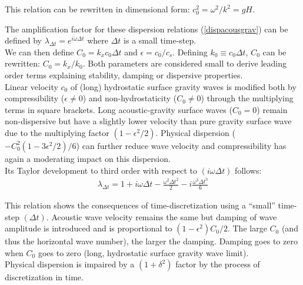 \documentclass[a4paper,11pt]{article}
\begin{document}
  This relation can be rewritten in dimensional form: $c_0^2 = {\omega^2}/{k^2}= gH$.
  
  The amplification factor for these dispersion relations (\ref{dispacousgrav}) can be defined by $\lambda_{\Delta t}=e^{i\omega\Delta t}$ where $\Delta t$ is a small time-step.\\

  We can then define $C_0=k_x c_0\Delta t$ and $\epsilon={c_0}/{c_s}$. Defining $ k_0\equiv c_0 \Delta t$, $C_0$ can be rewritten: $C_0=k_x/k_0$.
  Both parameters are considered small to derive leading order terms explaining stability, damping or dispersive properties.\\
    
    
  Linear velocity $c_0$ of (long) hydrostatic surface gravity waves is modified both by compressibility ($\epsilon\ne0$) and non-hydrostaticity ($C_0\ne0$) through the multiplying terms in square brackets. Long acoustic-gravity surface waves ($C_0=0$) remain non-dispersive but have a slightly lower velocity than pure gravity surface wave due to the multiplying factor $(1-\epsilon^2/2)$. Physical dispersion ($-C_0^2(1-3\epsilon^2/2)/6$) can further reduce wave velocity and compressibility has again a moderating impact on this dispersion.\\

  Its Taylor development to third order with respect to $(i\omega\Delta t)$ follows:
  \begin{equation}
   \label{lambdadt}
    \begin{split}
      \displaystyle
      \lambda_{\Delta t}=1+i\omega\Delta{t}-\frac{\omega^2\Delta{t}^2}{2}-i\frac{\omega^3\Delta{t}^3}{6}
    \end{split}
    \end{equation}
\label{lambda_ana}

This relation shows the consequences of time-discretization using a ``small'' time-step $(\Delta t)$. Acoustic wave velocity remains the same but damping of wave amplitude is introduced and is proportional to $(1-\epsilon^2)C_0/2$. The large $C_0$ (and thus the horizontal wave number), the larger the damping. Damping goes to zero when $C_0$ goes to zero (long, hydrostatic surface gravity wave limit).\\
Physical dispersion is impaired by a $(1+\delta^2)$ factor by the process of discretization in time.\\
\end{document}
